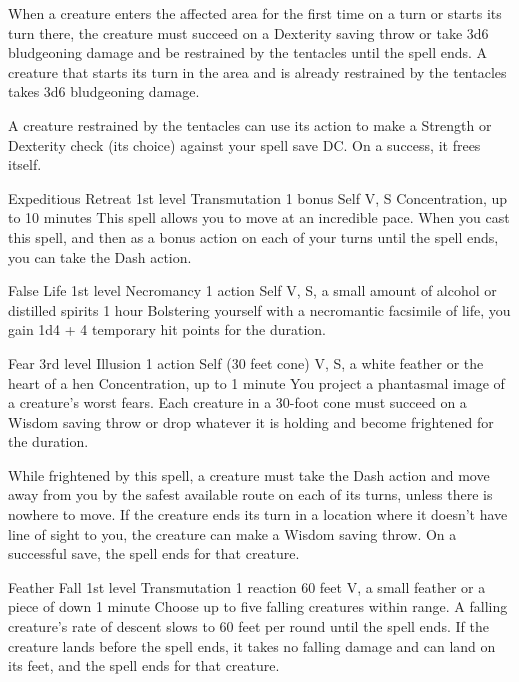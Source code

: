 \documentclass[10pt,a4paper,twoside,bg=print,twocolumn,openany,nodeprecatedcode]{dndbook}
\begin{document}
When a creature enters the affected area for the first time on a turn or starts its turn there, the creature must succeed on a Dexterity saving throw or take 3d6 bludgeoning damage and be restrained by the tentacles until the spell ends. A creature that starts its turn in the area and is already restrained by the tentacles takes 3d6 bludgeoning damage.

A creature restrained by the tentacles can use its action to make a Strength or Dexterity check (its choice) against your spell save DC. On a success, it frees itself.



\DndSpellHeader%
{Expeditious Retreat}
{1st level Transmutation}
{1 bonus}
{Self}
{V, S}
{Concentration, up to 10 minutes}
This spell allows you to move at an incredible pace. When you cast this spell, and then as a bonus action on each of your turns until the spell ends, you can take the Dash action.



\DndSpellHeader%
{False Life}
{1st level Necromancy}
{1 action}
{Self}
{V, S, a small amount of alcohol or distilled spirits}
{1 hour}
Bolstering yourself with a necromantic facsimile of life, you gain 1d4 + 4 temporary hit points for the duration.



\DndSpellHeader%
{Fear}
{3rd level Illusion}
{1 action}
{Self (30 feet cone)}
{V, S, a white feather or the heart of a hen}
{Concentration, up to 1 minute}
You project a phantasmal image of a creature's worst fears. Each creature in a 30-foot cone must succeed on a Wisdom saving throw or drop whatever it is holding and become frightened for the duration.

While frightened by this spell, a creature must take the Dash action and move away from you by the safest available route on each of its turns, unless there is nowhere to move. If the creature ends its turn in a location where it doesn't have line of sight to you, the creature can make a Wisdom saving throw. On a successful save, the spell ends for that creature.



\DndSpellHeader%
{Feather Fall}
{1st level Transmutation}
{1 reaction}
{60 feet}
{V, a small feather or a piece of down}
{1 minute}
Choose up to five falling creatures within range. A falling creature's rate of descent slows to 60 feet per round until the spell ends. If the creature lands before the spell ends, it takes no falling damage and can land on its feet, and the spell ends for that creature.
\end{document}
